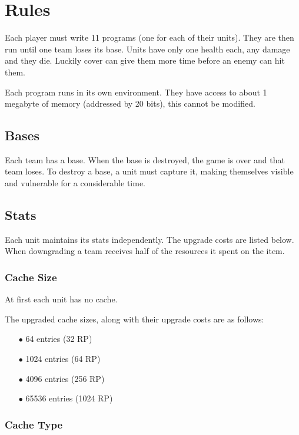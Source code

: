 \documentclass{article}
\begin{document}
\section*{Rules}

Each player must write 11 programs (one for each of their units). They are then
run until one team loses its base. Units have only one health each, any damage
and they die. Luckily cover can give them more time before an enemy can hit
them.

Each program runs in its own environment. They have access to about 1 megabyte
of memory (addressed by 20 bits), this cannot be modified.

\subsection*{Bases}

Each team has a base. When the base is destroyed, the game is over and that team
loses. To destroy a base, a unit must capture it, making themselves visible and
vulnerable for a considerable time.

\subsection*{Stats}

Each unit maintains its stats independently. The upgrade costs are listed below.
When downgrading a team receives half of the resources it spent on the item.

\subsubsection*{Cache Size}

At first each unit has no cache.

The upgraded cache sizes, along with their upgrade costs are as follows:

\begin{itemize}[noitemsep]
    \item[$\bullet$] 64 entries (32 RP)
    \item[$\bullet$] 1024 entries (64 RP)
    \item[$\bullet$] 4096 entries (256 RP)
    \item[$\bullet$] 65536 entries (1024 RP)
\end{itemize}

\subsubsection*{Cache Type}
\end{document}
